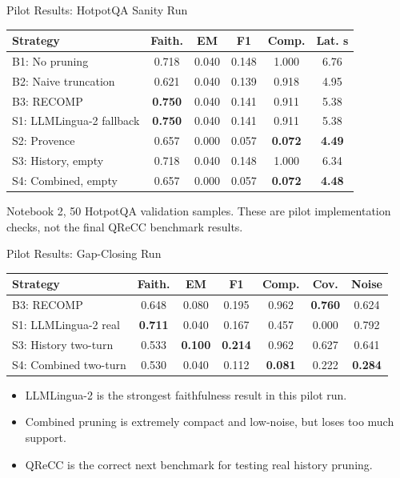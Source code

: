 \documentclass[aspectratio=169,11pt]{beamer}
\begin{document}
\begin{frame}{Pilot Results: HotpotQA Sanity Run}
  \small
  \begin{tabular}{lccccc}
    \toprule
    Strategy & Faith. & EM & F1 & Comp. & Lat. s \\
    \midrule
    B1: No pruning & 0.718 & 0.040 & 0.148 & 1.000 & 6.76 \\
    B2: Naive truncation & 0.621 & 0.040 & 0.139 & 0.918 & 4.95 \\
    B3: RECOMP & \textbf{0.750} & 0.040 & 0.141 & 0.911 & 5.38 \\
    S1: LLMLingua-2 fallback & \textbf{0.750} & 0.040 & 0.141 & 0.911 & 5.38 \\
    S2: Provence & 0.657 & 0.000 & 0.057 & \textbf{0.072} & \textbf{4.49} \\
    S3: History, empty & 0.718 & 0.040 & 0.148 & 1.000 & 6.34 \\
    S4: Combined, empty & 0.657 & 0.000 & 0.057 & \textbf{0.072} & \textbf{4.48} \\
    \bottomrule
  \end{tabular}

  \vspace{0.8em}
  \footnotesize Notebook 2, 50 HotpotQA validation samples. These are pilot implementation checks, not the final QReCC benchmark results.
\end{frame}

\begin{frame}{Pilot Results: Gap-Closing Run}
  \small
  \begin{tabular}{lcccccc}
    \toprule
    Strategy & Faith. & EM & F1 & Comp. & Cov. & Noise \\
    \midrule
    B3: RECOMP & 0.648 & 0.080 & 0.195 & 0.962 & \textbf{0.760} & 0.624 \\
    S1: LLMLingua-2 real & \textbf{0.711} & 0.040 & 0.167 & 0.457 & 0.000 & 0.792 \\
    S3: History two-turn & 0.533 & \textbf{0.100} & \textbf{0.214} & 0.962 & 0.627 & 0.641 \\
    S4: Combined two-turn & 0.530 & 0.040 & 0.112 & \textbf{0.081} & 0.222 & \textbf{0.284} \\
    \bottomrule
  \end{tabular}

  \vspace{0.8em}
  \begin{itemize}
    \item LLMLingua-2 is the strongest faithfulness result in this pilot run.
    \item Combined pruning is extremely compact and low-noise, but loses too much support.
    \item QReCC is the correct next benchmark for testing real history pruning.
  \end{itemize}
\end{frame}
\end{document}
